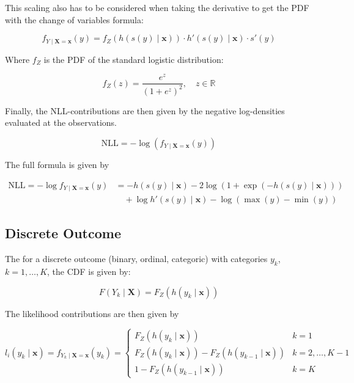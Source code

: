 This scaling also has to be considered when taking the derivative to get the PDF with the change of variables formula:

\begin{equation}
f_{Y \mid \mathbf{X} = \mathbf{x}}(y) = f_Z(h(s(y) \mid \mathbf{x})) \cdot h'(s(y) \mid \mathbf{x}) \cdot s'(y)
\end{equation}

Where $f_Z$ is the PDF of the standard logistic distribution:

\begin{equation}
f_Z(z) = \frac{e^{z}}{(1 + e^{z})^2}, \quad z \in \mathbb{R}
\end{equation}

Finally, the NLL-contributions are then given by the negative log-densities evaluated at the observations.

\begin{equation}
\text{NLL} = - \log (f_{Y \mid \mathbf{X} = \mathbf{x}}(y))
\end{equation}

The full formula is given by

\begin{align}
\text{NLL} = - \log f_{Y \mid \mathbf{X} = \mathbf{x}}(y)
&= -h(s(y) \mid \mathbf{x}) - 2 \log(1 + \exp(-h(s(y) \mid \mathbf{x}))) \nonumber \\
&\quad + \log h'(s(y) \mid \mathbf{x}) - \log(\max(y) - \min(y))
\end{align}




\subsection{Discrete Outcome}


The for a discrete outcome (binary, ordinal, categoric) with categories $y_k$, $k = 1, \ldots, K$, the CDF is given by:

\begin{equation}
F(Y_k \mid \mathbf{X}) = F_Z(h(y_k \mid \mathbf{x}))
\end{equation}

The likelihood contributions are then given by

\begin{equation}
l_i(y_k \mid \mathbf{x}) = f_{Y_k \mid \mathbf{X} = \mathbf{x}}(y_k) =
    \begin{cases}
      F_Z(h(y_k \mid \mathbf{x})) & k=1\\
      F_Z(h(y_k \mid \mathbf{x})) - F_Z(h(y_{k-1} \mid \mathbf{x})) & k=2,\ldots, K-1\\
      1- F_Z(h(y_{k-1} \mid \mathbf{x})) & k = K
    \end{cases}
\end{equation}


